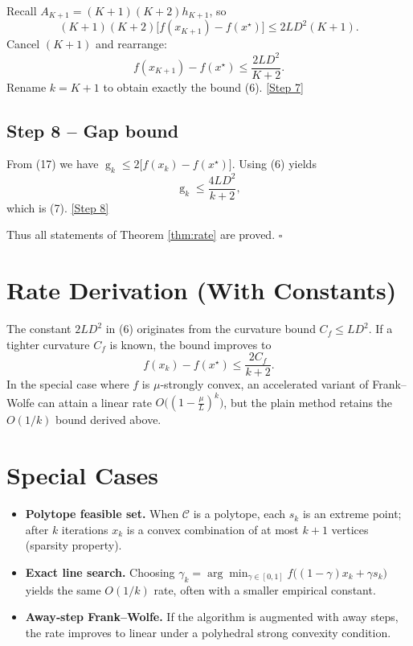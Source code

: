 \documentclass{article}
\newcommand{\gap}{\operatorname{g}}
\begin{document}
Recall $A_{K+1} = (K+1)(K+2)h_{K+1}$, so
\[
(K+1)(K+2)\bigl[f(x_{K+1})-f(x^\star)\bigr]
\le 2L D^{2}(K+1) .
\tag{26}
\]
Cancel $(K+1)$ and rearrange:
\[
f(x_{K+1})-f(x^\star) \le \frac{2L D^{2}}{K+2} .
\tag{27}
\]
Rename $k=K+1$ to obtain exactly the bound (6).  
\underline{[Step 7]}

\subsection*{Step 8 – Gap bound}
From (17) we have $\gap_k \le 2\bigl[f(x_k)-f(x^\star)\bigr]$.  
Using (6) yields
\[
\gap_k \le \frac{4L D^{2}}{k+2},
\]
which is (7).  
\underline{[Step 8]}

Thus all statements of Theorem \ref{thm:rate} are proved. $\square$

\section*{Rate Derivation (With Constants)}
The constant $2L D^{2}$ in (6) originates from the curvature bound $C_f\le L D^{2}$.
If a tighter curvature $C_f$ is known, the bound improves to
\[
f(x_k)-f(x^\star) \le \frac{2 C_f}{k+2}.
\tag{28}
\]
In the special case where $f$ is $\mu$‑strongly convex, an accelerated variant of Frank–Wolfe can attain a linear rate $O\!\bigl((1-\frac{\mu}{L})^{k}\bigr)$, but the plain method retains the $O(1/k)$ bound derived above.

\section*{Special Cases}
\begin{itemize}[leftmargin=*]
\item \textbf{Polytope feasible set.} When $\mathcal{C}$ is a polytope, each $s_k$ is an extreme point; after $k$ iterations $x_k$ is a convex combination of at most $k+1$ vertices (sparsity property).
\item \textbf{Exact line search.} Choosing $\gamma_k = \arg\min_{\gamma\in[0,1]} f\bigl((1-\gamma)x_k+\gamma s_k\bigr)$ yields the same $O(1/k)$ rate, often with a smaller empirical constant.
\item \textbf{Away‑step Frank–Wolfe.} If the algorithm is augmented with away steps, the rate improves to linear under a polyhedral strong convexity condition.
\end{itemize}
\end{document}
